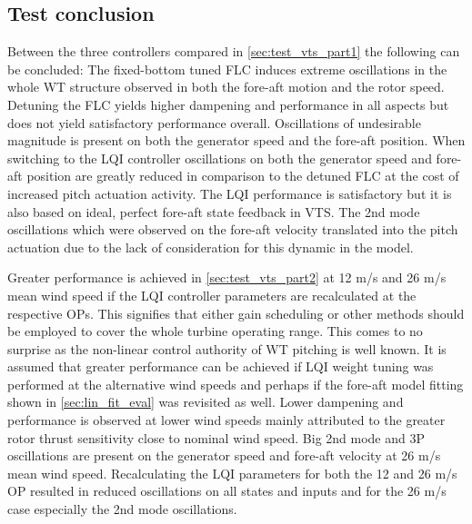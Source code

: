 \subsection{Test conclusion}
Between the three controllers compared in \cref{sec:test_vts_part1} the following can be concluded: The fixed-bottom tuned FLC induces extreme oscillations in the whole WT structure observed in both the fore-aft motion and the rotor speed. Detuning the FLC yields higher dampening and performance in all aspects but does not yield satisfactory performance overall. Oscillations of undesirable magnitude is present on both the generator speed and the fore-aft position. When switching to the LQI controller oscillations on both the generator speed and fore-aft position are greatly reduced in comparison to the detuned FLC at the cost of increased pitch actuation activity. The LQI performance is satisfactory but it is also based on ideal, perfect fore-aft state feedback in VTS. The 2nd mode oscillations which were observed on the fore-aft velocity translated into the pitch actuation due to the lack of consideration for this dynamic in the model.

Greater performance is achieved in \cref{sec:test_vts_part2} at 12 m/s and 26 m/s mean wind speed if the LQI controller parameters are recalculated at the respective OPs. This signifies that either gain scheduling or other methods should be employed to cover the whole turbine operating range. This comes to no surprise as the non-linear control authority of WT pitching is well known. It is assumed that greater performance can be achieved if LQI weight tuning was performed at the alternative wind speeds and perhaps if the fore-aft model fitting shown in \cref{sec:lin_fit_eval} was revisited as well. Lower dampening and performance is observed at lower wind speeds mainly attributed to the greater rotor thrust sensitivity close to nominal wind speed. Big 2nd mode and 3P oscillations are present on the generator speed and fore-aft velocity at 26 m/s mean wind speed. Recalculating the LQI parameters for both the 12 and 26 m/s OP resulted in reduced oscillations on all states and inputs and for the 26 m/s case especially the 2nd mode oscillations.
